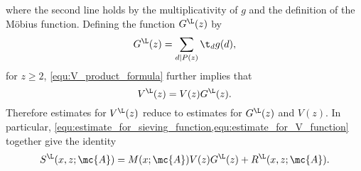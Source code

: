     where the second line holds by the multiplicativity of $g$ and the definition of the M\"obius function. Defining the function $G^{\L}(z)$ by
    \[
      G^{\L}(z) = \sum_{d \mid P(z)}\t_{d}g(d),
    \]
    for $z \ge 2$, \cref{equ:V_product_formula} further implies that
    \begin{equation}\label{equ:estimate_for_V_function}
      V^{\L}(z) = V(z)G^{\L}(z).
    \end{equation}
    Therefore estimates for $V^{\L}(z)$ reduce to estimates for $G^{\L}(z)$ and $V(z)$. In particular, \cref{equ:estimate_for_sieving_function,equ:estimate_for_V_function} together give the identity
    \[
      S^{\L}(x,z;\mc{A}) = M(x;\mc{A})V(z)G^{\L}(z)+R^{\L}(x,z;\mc{A}).
    \]